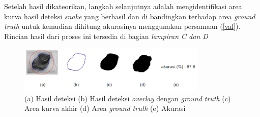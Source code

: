 Setelah hasil dikateorikan, langkah selanjutnya adalah mengidentifikasi area kurva hasil deteksi \emph{snake} yang berhasil dan di bandingkan terhadap area \emph{ground truth} untuk kemudian dihitung akurasinya menggunakan persamaan (\ref{val}). Rincian hasil dari proses ini tersedia di bagian \emph{lampiran C dan D}
\begin{figure}[H]
	\centering
	\includegraphics[width=0.8\textwidth]{gambar/result_val}
	\caption{(a) Hasil deteksi (b) Hasil deteksi \emph{overlay} dengan \emph{ground truth} (c) Area kurva akhir (d) Area \emph{ground truth} (e) Akurasi}
	\label{Gambar:result_val}
\end{figure}


